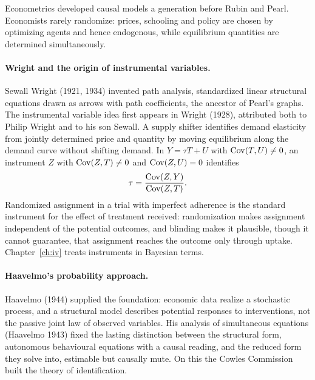 Econometrics developed causal models a generation before Rubin and Pearl. Economists rarely randomize: prices, schooling and policy are chosen by optimizing agents and hence endogenous, while equilibrium quantities are determined simultaneously.

\paragraph{Wright and the origin of instrumental variables.} Sewall Wright (1921, 1934) invented path analysis, standardized linear structural equations drawn as arrows with path coefficients, the ancestor of Pearl's graphs. The instrumental variable idea first appears in Wright (1928), attributed both to Philip Wright and to his son Sewall. A supply shifter identifies demand elasticity from jointly determined price and quantity by moving equilibrium along the demand curve without shifting demand. In $Y = \tau T + U$ with $\mathrm{Cov}(T,U)\neq 0$, an instrument $Z$ with $\mathrm{Cov}(Z,T)\neq 0$ and $\mathrm{Cov}(Z,U)=0$ identifies
\begin{equation}\label{fw:eq:iv}
\tau = \frac{\mathrm{Cov}(Z,Y)}{\mathrm{Cov}(Z,T)} .
\end{equation}
Randomized assignment in a trial with imperfect adherence is the standard instrument for the effect of treatment received: randomization makes assignment independent of the potential outcomes, and blinding makes it plausible, though it cannot guarantee, that assignment reaches the outcome only through uptake. Chapter~\ref{ch:iv} treats instruments in Bayesian terms.

\paragraph{Haavelmo's probability approach.} Haavelmo (1944) supplied the foundation: economic data realize a stochastic process, and a structural model describes potential responses to interventions, not the passive joint law of observed variables. His analysis of simultaneous equations (Haavelmo 1943) fixed the lasting distinction between the structural form, autonomous behavioural equations with a causal reading, and the reduced form they solve into, estimable but causally mute. On this the Cowles Commission built the theory of identification.


